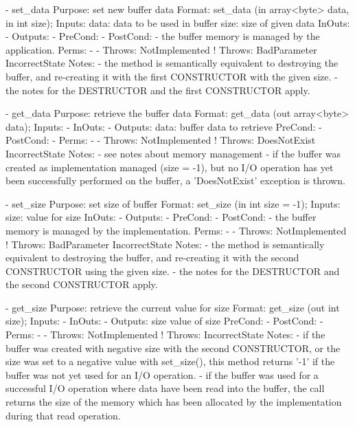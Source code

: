 \begin{myspec}
 
    - set_data
      Purpose:  set new buffer data
      Format:   set_data             (in  array<byte> data, 
                                      in  int         size);
      Inputs:   data:                 data to be used in buffer
                size:                 size of given data
      InOuts:   -
      Outputs:  -
      PreCond:  -
      PostCond: - the buffer memory is managed by the
                  application.
      Perms:    -
-     Throws:   NotImplemented
!     Throws:   BadParameter
                IncorrectState
      Notes:    - the method is semantically equivalent to
                  destroying the buffer, and re-creating it with
                  the first CONSTRUCTOR with the given size.
                - the notes for the DESTRUCTOR and the first
                  CONSTRUCTOR apply.
 
 
    - get_data
      Purpose:  retrieve the buffer data
      Format:   get_data             (out array<byte> data);
      Inputs:   -
      InOuts:   -
      Outputs:  data:                 buffer data to retrieve
      PreCond:  -
      PostCond: -
      Perms:    -
-     Throws:   NotImplemented
!     Throws:   DoesNotExist
                IncorrectState
      Notes:    - see notes about memory management
                - if the buffer was created as implementation
                  managed (size = -1), but no I/O operation has
                  yet been successfully performed on the buffer,
                  a 'DoesNotExist' exception is thrown.
 
 
    - set_size
      Purpose:  set size of buffer
      Format:   set_size           (in  int   size = -1);
      Inputs:   size:               value for size
      InOuts:   -
      Outputs:  -
      PreCond:  - 
      PostCond: - the buffer memory is managed by the
                  implementation.
      Perms:    -
-     Throws:   NotImplemented
!     Throws:   BadParameter
                IncorrectState
      Notes:    - the method is semantically equivalent to
                  destroying the buffer, and re-creating it with
                  the second CONSTRUCTOR using the given size.
                - the notes for the DESTRUCTOR and the second
                  CONSTRUCTOR apply.
 
 
    - get_size
      Purpose:  retrieve the current value for size
      Format:   get_size           (out int   size);
      Inputs:   -
      InOuts:   -
      Outputs:  size               value of size
      PreCond:  -
      PostCond: -
      Perms:    -
-     Throws:   NotImplemented
!     Throws:   IncorrectState
      Notes:    - if the buffer was created with negative size
                  with the second CONSTRUCTOR, or the size was
                  set to a negative value with set_size(), this
                  method returns '-1' if the buffer was not yet
                  used for an I/O operation.  
                - if the buffer was used for a successful I/O
                  operation where data have been read into the
                  buffer, the call returns the size of the 
                  memory which has been allocated by the
                  implementation during that read operation.
 

\end{myspec}
